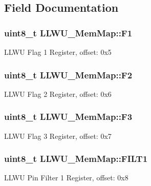 \subsection{Field Documentation}
\hypertarget{struct_l_l_w_u___mem_map_acb7ec83bb70ec1313cd2e0682b1ee75c}{}
\subsubsection[{F1}]{\setlength{\rightskip}{0pt plus 5cm}uint8\+\_\+t L\+L\+W\+U\+\_\+\+Mem\+Map\+::\+F1}\label{struct_l_l_w_u___mem_map_acb7ec83bb70ec1313cd2e0682b1ee75c}
L\+L\+W\+U Flag 1 Register, offset\+: 0x5 \hypertarget{struct_l_l_w_u___mem_map_a108405432abc40a34ccbb2c0d7ecfdb4}{}
\subsubsection[{F2}]{\setlength{\rightskip}{0pt plus 5cm}uint8\+\_\+t L\+L\+W\+U\+\_\+\+Mem\+Map\+::\+F2}\label{struct_l_l_w_u___mem_map_a108405432abc40a34ccbb2c0d7ecfdb4}
L\+L\+W\+U Flag 2 Register, offset\+: 0x6 \hypertarget{struct_l_l_w_u___mem_map_a47d12785dc2fc2afa376e2398c7619f1}{}
\subsubsection[{F3}]{\setlength{\rightskip}{0pt plus 5cm}uint8\+\_\+t L\+L\+W\+U\+\_\+\+Mem\+Map\+::\+F3}\label{struct_l_l_w_u___mem_map_a47d12785dc2fc2afa376e2398c7619f1}
L\+L\+W\+U Flag 3 Register, offset\+: 0x7 \hypertarget{struct_l_l_w_u___mem_map_a80ad19326e9bf7209c71d7955e4ef044}{}
\subsubsection[{F\+I\+L\+T1}]{\setlength{\rightskip}{0pt plus 5cm}uint8\+\_\+t L\+L\+W\+U\+\_\+\+Mem\+Map\+::\+F\+I\+L\+T1}\label{struct_l_l_w_u___mem_map_a80ad19326e9bf7209c71d7955e4ef044}
L\+L\+W\+U Pin Filter 1 Register, offset\+: 0x8 \hypertarget{struct_l_l_w_u___mem_map_a84fdf2d8e40d91c4ad620512aaca152b}{}
